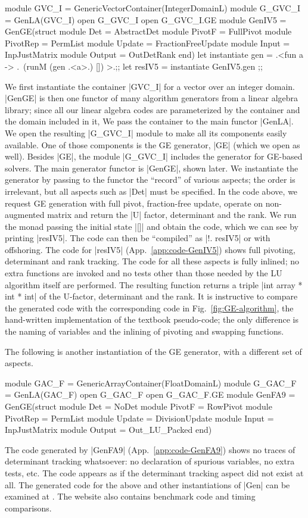 \documentclass{elsart}
\begin{document}
\begin{code}
module GVC_I = GenericVectorContainer(IntegerDomainL)
module G_GVC_I = GenLA(GVC_I)
open G_GVC_I
open G_GVC_I.GE
module GenIV5 = GenGE(struct 
    module Det = AbstractDet
    module PivotF = FullPivot
    module PivotRep = PermList
    module Update = FractionFreeUpdate
    module Input = InpJustMatrix
    module Output = OutDetRank end)
let instantiate gen =
    .<fun a -> .~(runM (gen .<a>.) []) >.;;
let resIV5 = instantiate GenIV5.gen ;;
\end{code}
%
We first instantiate the container |GVC_I| for a vector over an
integer domain.  |GenGE| is then one functor of many algorithm
generators from a linear algebra library; since all our linear algebra codes
are parameterized by the container and the domain included in it,
We pass the container to the main functor |GenLA|.
We open the resulting |G_GVC_I| module
to make all its components easily available. One of those components
is the GE generator, |GE| (which we open as well). Besides |GE|, the
module |G_GVC_I| includes the generator for GE-based solvers.  The main
generator functor is |GenGE|, shown later.  We instantiate the
generator by passing to the functor the ``record'' of various aspects; the
order is irrelevant, but all aspects such as |Det| must be
specified. In the code above, we request GE generation with full
pivot, fraction-free update, operate on non-augmented matrix and
return the |U| factor, determinant and the rank. We run the monad
passing the initial state |[]| and obtain the code, which we can see
by printing |resIV5|. The code can then be ``compiled'' as |!. resIV5|
or with offshoring\cite{offshoring}. The code for |resIV5|
(App.~\ref{app:code-GenIV5}) shows full
pivoting, determinant and rank tracking. The code for all these
aspects is fully inlined; no extra functions are invoked and no tests
other than those needed by the LU algorithm itself are performed. The
resulting function returns a triple |int array * int * int| of the
U-factor, determinant and the rank. It is instructive to compare the
generated code with the corresponding code in
Fig.~\ref{fig:GE-algorithm}, the hand-written implementation of the
textbook pseudo-code; the only difference is the naming of
variables and the inlining of pivoting and swapping functions.

The following is another instantiation of the GE generator, with a
different set of aspects.
\begin{code}
module GAC_F = GenericArrayContainer(FloatDomainL)
module G_GAC_F = GenLA(GAC_F)
open G_GAC_F
open G_GAC_F.GE
module GenFA9 = GenGE(struct 
    module Det = NoDet
    module PivotF = RowPivot
    module PivotRep = PermList
    module Update = DivisionUpdate
    module Input = InpJustMatrix
    module Output = Out_LU_Packed end)
\end{code}
The code generated by |GenFA9| (App.~\ref{app:code-GenFA9}) shows no traces of
determinant tracking whatsoever: no declaration of spurious variables,
no extra tests, etc. The code appears as if the determinant tracking
aspect did not exist at all. The generated code for the above and
other instantiations of |Gen| can be examined at
\cite{metamonadsURL}. The website also contains benchmark code and
timing comparisons.
\end{document}
